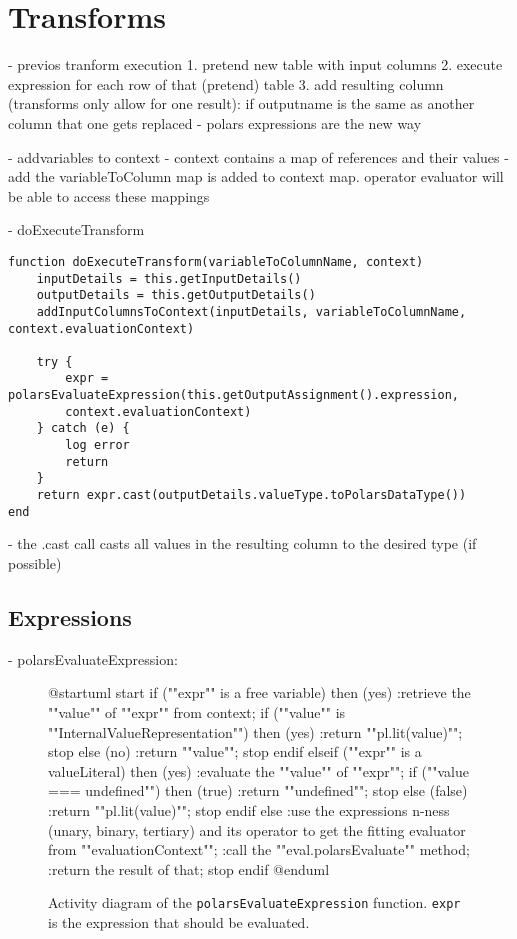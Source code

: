 \section{Transforms}
\label{section:impl:transforms}
- previos tranform execution
1. pretend new table with input columns
2. execute expression for each row of that (pretend) table
3. add resulting column (transforms only allow for one result): if outputname is the same as another column that one gets replaced
- polars expressions are the new way

- addvariables to context
- context contains a map of references and their values
- add the variableToColumn map is added to context map. operator evaluator will be able to access these mappings

- doExecuteTransform
\begin{listing}
	\begin{verbatim}
function doExecuteTransform(variableToColumnName, context)
	inputDetails = this.getInputDetails()
	outputDetails = this.getOutputDetails()
	addInputColumnsToContext(inputDetails, variableToColumnName, context.evaluationContext)

	try {
		expr = polarsEvaluateExpression(this.getOutputAssignment().expression,
		context.evaluationContext)
	} catch (e) {
		log error
		return
	}
	return expr.cast(outputDetails.valueType.toPolarsDataType())
end
	\end{verbatim}
\end{listing}
- the .cast call casts all values in the resulting column to the desired type (if possible)

\subsection{Expressions}
- polarsEvaluateExpression:
\begin{figure}
	\begin{plantuml}
		@startuml
		start
		if (""expr"" is a free variable) then (yes)
		:retrieve the ""value"" of ""expr"" from context;
		if (""value"" is ""InternalValueRepresentation"") then (yes)
		:return ""pl.lit(value)"";
		stop
		else (no)
		:return ""value"";
		stop
		endif
		elseif (""expr"" is a valueLiteral) then (yes)
		:evaluate the ""value"" of ""expr"";
		if (""value === undefined"") then (true)
		:return ""undefined"";
		stop
		else (false)
		:return ""pl.lit(value)"";
		stop
		endif
		else
		:use the expressions n-ness (unary, binary, tertiary) and its
		operator to get the fitting evaluator from ""evaluationContext"";
		:call the ""eval.polarsEvaluate"" method;
		:return the result of that;
		stop
		endif
		@enduml
	\end{plantuml}
	\caption{
		Activity diagram of the \Verb|polarsEvaluateExpression| function.
		\Verb|expr| is the expression that should be evaluated. %
	}
	\label{fig:uml:polars_evaluate_expression}
\end{figure}


